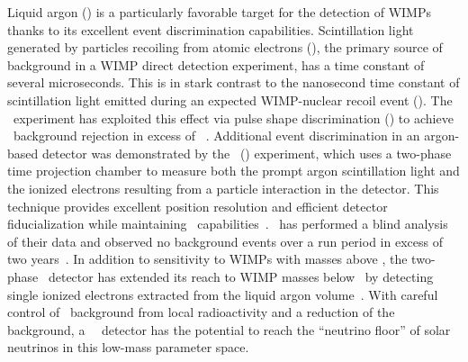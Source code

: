 Liquid argon (\LAr) is a particularly favorable target for the detection of WIMPs thanks to its excellent event discrimination capabilities. Scintillation light generated by particles recoiling from atomic electrons (\ERs), the primary source of background in a WIMP direct detection experiment, has a time constant of several microseconds. This is in stark contrast to the nanosecond time constant of scintillation light emitted during an expected WIMP-nuclear recoil event (\NR). The \DEAP\ experiment has exploited this effect via pulse shape discrimination (\PSD) to achieve \ER\ background rejection in excess of \DEAPPSDRejection~\cite{Amaudruz:2018gr,Ajaj:2019wi}. Additional event discrimination in an argon-based detector was demonstrated by the \DSf\ (\DSfs) experiment, which uses a two-phase time projection chamber to measure both the prompt argon scintillation light and the ionized electrons resulting from a particle interaction in the detector. This technique provides excellent position resolution and efficient detector fiducialization while maintaining \PSD\ capabilities~\cite{Agnes:2015gu,Agnes:2016fz}.  \DSfs\ has performed a blind analysis of their data and observed no background events over a run period in excess of two years~\cite{Agnes:2018ep}. In addition to sensitivity to WIMPs with masses above \DSkHighMassThreshold, the two-phase \DSfs\ detector has extended its reach to WIMP masses below \DSlLowMassThreshold\ by detecting single ionized electrons extracted from the liquid argon volume~\cite{Agnes:2018fg,Agnes:2018ft}.  With careful control of \ER\ background from local radioactivity and a reduction of the  background, a \DSlApproxMassScale\ \LAr\ detector has the potential to reach the ``neutrino floor'' of solar neutrinos in this low-mass parameter space.

